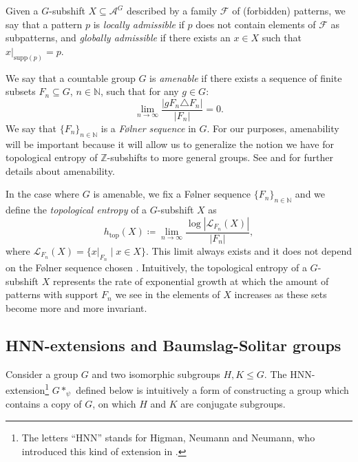 \documentclass[letterpaper,11pt,reqno]{amsart}
\theoremstyle{plain}
\theoremstyle{definition}
\def\htop{h_{\mathrm{top}}}
\begin{document}
Given a $G$-subshift $X\subseteq \mathcal{A}^G$ described by a family $\mathcal{F}$ of (forbidden) patterns, we say that a pattern $p$ is \textit{locally admissible} if $p$ does not contain elements of $\mathcal{F}$ as subpatterns, and \textit{globally admissible} if there exists an $x\in X$ such that $x|_{\mathrm{supp}(p)}=p$.


We say that a countable group $G$ is \textit{amenable} if there exists a sequence of finite subsets $F_n\subseteq G$, $n\in \mathbb{N}$, such that for any $g\in G$:
$$
\lim_{n\to \infty}\frac{|gF_n\triangle F_n|}{|F_n|}=0.
$$
We say that $\{F_n\}_{n\in \mathbb{N}}$ is a \textit{F\o lner sequence} in $G$. For our purposes, amenability will be important because it will allow us to generalize the notion we have for topological entropy of $\mathbb{Z}$-subshifts to more general groups. See \cite[Chapter 9]{Loh_geometric} and \cite[Chapter 4]{Cellular_automata_and_groups} for further details about amenability.


In the case where $G$ is amenable, we fix a F\o lner sequence $\{F_n\}_{n\in \mathbb{N}}$ and we define the \textit{topological entropy} of a $G$-subshift $X$ as
$$
\htop(X)\coloneqq \lim_{n\to \infty}\frac{\log|\mathcal{L}_{F_n}(X)|}{|F_n|},
$$
where  $\mathcal{L}_{F_n}(X)=\{x|_{F_n}\mid x\in X\}$. This limit always exists and it does not depend on the F\o lner sequence chosen \cite[Theorem~4.38]{Kerr2016}. Intuitively, the topological entropy of a $G$-subshift $X$ represents the rate of exponential growth at which the amount of patterns with support $F_n$ we see in the elements of $X$ increases as these sets become more and more invariant.


\subsection{HNN-extensions and Baumslag-Solitar groups}
Consider a group $G$ and two isomorphic subgroups $H,K\le G$. The HNN-extension\footnote{The letters ``HNN'' stands for Higman, Neumann and Neumann, who introduced this kind of extension in \cite{HNN49}.} $G*_{\psi}$ defined below is intuitively a form of constructing a group which contains a copy of $G$, on which $H$ and $K$ are conjugate subgroups.
\end{document}
